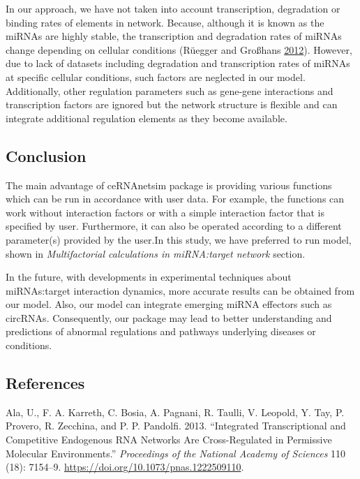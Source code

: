 \documentclass[]{article}
\begin{document}
In our approach, we have not taken into account transcription,
degradation or binding rates of elements in network. Because, although
it is known as the miRNAs are highly stable, the transcription and
degradation rates of miRNAs change depending on cellular conditions
(Rüegger and Großhans
\protect\hyperlink{ref-ruegger_microrna_2012}{2012}). However, due to
lack of datasets including degradation and transcription rates of miRNAs
at specific cellular conditions, such factors are neglected in our
model. Additionally, other regulation parameters such as gene-gene
interactions and transcription factors are ignored but the network
structure is flexible and can integrate additional regulation elements
as they become available.

\hypertarget{conclusion}{%
\subsection{Conclusion}\label{conclusion}}

The main advantage of ceRNAnetsim package is providing various functions
which can be run in accordance with user data. For example, the
functions can work without interaction factors or with a simple
interaction factor that is specified by user. Furthermore, it can also
be operated according to a different parameter(s) provided by the
user.In this study, we have preferred to run model, shown in
\emph{Multifactorial calculations in miRNA:target network} section.

In the future, with developments in experimental techniques about
miRNAs:target interaction dynamics, more accurate results can be
obtained from our model. Also, our model can integrate emerging miRNA
effectors such as circRNAs. Consequently, our package may lead to better
understanding and predictions of abnormal regulations and pathways
underlying diseases or conditions.

\hypertarget{references}{%
\subsection*{References}\label{references}}

\hypertarget{refs}{}
\leavevmode\hypertarget{ref-ala_integrated_2013}{}%
Ala, U., F. A. Karreth, C. Bosia, A. Pagnani, R. Taulli, V. Leopold, Y.
Tay, P. Provero, R. Zecchina, and P. P. Pandolfi. 2013. ``Integrated
Transcriptional and Competitive Endogenous RNA Networks Are
Cross-Regulated in Permissive Molecular Environments.''
\emph{Proceedings of the National Academy of Sciences} 110 (18):
7154--9. \url{https://doi.org/10.1073/pnas.1222509110}.
\end{document}
